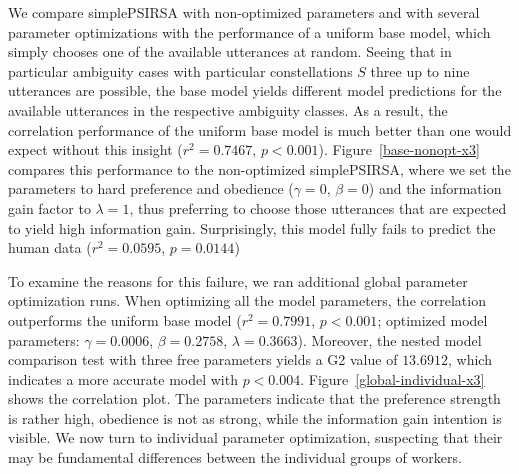 \documentclass[10pt,a4paper]{article}
\begin{document}
We compare simplePSIRSA with non-optimized parameters and with several parameter optimizations with the performance of a uniform base model, which simply chooses one of the available utterances at random. 
Seeing that in particular ambiguity cases with particular constellations $S$ three up to nine utterances are possible, the base model yields different model predictions for the available utterances in the respective ambiguity classes. 
As a result, the correlation performance of the uniform base model is much better than one would expect without this insight ($r^2=0.7467$, $p<0.001$).
Figure~\ref{base-nonopt-x3} compares this performance to the non-optimized simplePSIRSA, where we set the parameters to hard preference and obedience ($\gamma=0$, $\beta=0$) and the information gain factor to $\lambda=1$, thus preferring to choose those utterances that are expected to yield high information gain. 
Surprisingly, this model fully fails to predict the human data ($r^2=0.0595$, $p=0.0144$)


To examine the reasons for this failure, we ran additional global parameter optimization runs.
When optimizing all the model parameters, the correlation outperforms the uniform base model ($r^2=0.7991$, $p<0.001$; optimized model parameters: $\gamma=0.0006$, $\beta=0.2758$, $\lambda=0.3663$).
Moreover, the nested model comparison test with three free parameters yields a G2 value of $13.6912$, which indicates a more accurate model with $p<0.004$. 
Figure~\ref{global-individual-x3} shows the correlation plot. 
The parameters indicate that the preference strength is rather high, obedience is not as strong, while the information gain intention is visible. 
We now turn to individual parameter optimization, suspecting that their may be fundamental differences between the individual groups of workers. 



\end{document}
